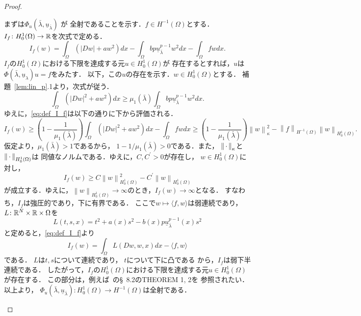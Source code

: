 \begin{proof}
\begin{enumerate}[1.]
        まずは$\Phi_u (\bar{\lambda}, \underline{u}_{\bar{\lambda}})$
        が
        全射であることを示す．$f \in H^{-1}(\Omega)$とする．
        $I_f \colon H_0^1(\Omega) \to \mathbb{R}$を次式で定める．
        \begin{equation}
         I_f (w) = \int_\Omega \left( \lvert Dw \rvert + aw^2 \right)
          dx - \int_\Omega bp \underline{u}_{\bar{\lambda}}^{p-1} w^2
          dx - \int_\Omega fw dx. \label{eq:def_I_f}
        \end{equation}
        $I_f$の$H_0^1(\Omega)$における下限を達成する元$u \in
        H_0^1(\Omega)$が
        存在するとすれば，$u$は$\Phi(\bar{\lambda},
        \underline{u}_\lambda)u = f$をみたす．
        以下，この$u$の存在を示す．$w \in H_0^1(\Omega)$とする．
        補題~\ref{lem:lin_p}.1より，次式が従う．
        \begin{equation}
         \int_\Omega \left( \lvert Dw \rvert^2 + aw^2 \right) dx \geq
          \mu_1(\bar{\lambda}) \int_\Omega bp
          \underline{u}_{\bar{\lambda}}^{p-1} w^2 dx.
          \label{eq:mu_1_bar_lambda_r} 
        \end{equation}
        ゆえに，\eqref{eq:def_I_f}は以下の通りに下から評価される．
        \[
         I_f(w) \geq \left( 1 - \frac{1}{\mu_1(\bar{\lambda})} \right)
        \int_\Omega \left( \lvert Dw \rvert^2 + aw^2\right) dx -
        \int_\Omega fw dx \geq \left( 1 -
        \frac{1}{\mu_1(\bar{\lambda})} \right) \left\| w
        \right\|_\kappa^2 - \left\| f \right\|_{H^{-1}(\Omega)}
        \left\| w \right\|_{H_0^1(\Omega)}.
        \]
        仮定より，$\mu_1(\bar{\lambda}) > 1$であるから，
        $1 - 1/\mu_1(\bar{\lambda}) > 0$である．また，
        $\left\|\, \cdot \, \right\|_\kappa$と$\left\|\, \cdot \, \right\|_{H_0^1(\Omega)}$は
        同値なノルムである．ゆえに，$C, C^\prime > 0$が存在し，
        $w \in H_0^1(\Omega)$に対し，
        \[
         I_f (w) \geq C \left\| w \right\|^2_{H_0^1(\Omega)} -
          C^\prime \left\| w \right\|_{H_0^1(\Omega)}          
        \]
        が成立する．ゆえに，$\left\| w \right\|_{H_0^1(\Omega)} \to
        \infty$のとき，$I_f(w) \to \infty$となる．
        すなわち，$I_f$は強圧的であり，下に有界である．
        ここで$w \mapsto \langle f, w \rangle$は弱連続であり，
        $L \colon \mathbb{R}^N \times \mathbb{R} \times \Omega$を
        \[
         L(t, s, x) = t^2 + a(x)s^2 - b(x)p
        \underline{u}_{\bar{\lambda}}^{p-1}(x) s^2
        \]
        と定めると，\eqref{eq:def_I_f}より
        \[
         I_f (w) = \int_\Omega L(Dw, w, x) dx - \langle f , w \rangle
        \]
        である．
        $L$は$t, s$について連続であり，
        $t$について下に凸である
        から，$I_f$は弱下半連続である．
        したがって，$I_f$の$H_0^1(\Omega)$における下限を達成する元$u
        \in H_0^1(\Omega)$が存在する．
        この部分は，例えば~\cite{MR2597943}の\S~8.2のTHEOREM 1, 2を
        参照されたい．以上より，
        $\Phi_u (\bar{\lambda}, \underline{u}_{\bar{\lambda}}) \colon
        H_0^1(\Omega) \to H^{-1}(\Omega)$は全射である．
        

\end{enumerate}
\end{proof}
